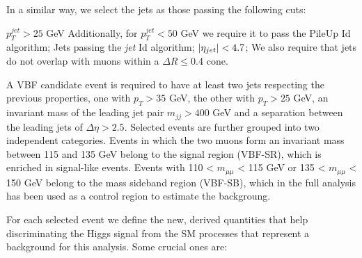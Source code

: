 In a similar way, we select the jets as those passing the following cuts:

\begin{outline}
\1 $p_T^{jet}>25$ GeV 
\1 Additionally, for $p_T^{jet}<50$ GeV we require it to pass the PileUp Id algorithm;
\1  Jets passing the \emph{jet} Id algorithm;
\1  $\abs{\eta_{jet}}<4.7$;
\1 We also require that jets do not overlap with muons within a $\Delta R\leq0.4$ cone.
\end{outline}

A VBF candidate event is required to have at least two jets respecting the previous properties, one with $p_T>35$ GeV, the other with $p_T>25$ GeV, an invariant mass of the leading jet pair $m_{jj}>400$ GeV and a separation between the leading jets of $\Delta\eta>2.5$. Selected events are further grouped into two independent categories. Events in which the two muons form an invariant mass between 115 and
135 GeV belong to the signal region (VBF-SR), which is enriched in signal-like events. Events with 110 < $m_{\mu\mu}$ < 115 GeV or 135 < $m_{\mu\mu}$ < 150 GeV belong to the mass sideband region (VBF-SB), which in the full analysis has been used as a control region to estimate the backgroung.

For each selected event we define the new, derived quantities that help discriminating the Higgs signal from the SM processes that represent a background for this analysis. Some crucial ones are:

